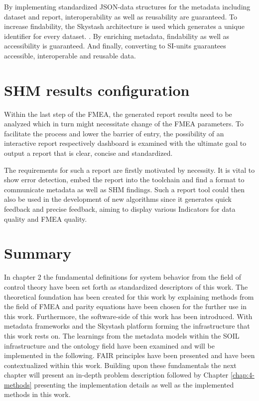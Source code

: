 
By implementing standardized JSON-data structures for the metadata including dataset and report, interoperability as well as reusability are guaranteed. To increase findability, the Skystash architecture is used which generates a unique identifier for every dataset. \cite{meyer_development_2020}. By enriching metadata, findability as well as accessibility is guaranteed. And finally, converting to SI-units guarantees accessible, interoperable and reusable data.

\newpage


\section{SHM results configuration}

Within the last step of the FMEA, the generated report results need to be analyzed which in turn might necessitate change of the FMEA parameters. To facilitate the process and lower the barrier of entry, the possibility of an interactive report respectively dashboard is examined with the ultimate goal to output a report that is clear, concise and standardized.


The requirements for such a report are firstly motivated by necessity. It is vital to show error detection, embed the report into the toolchain and find a format to communicate metadata as well as SHM findings. Such a report tool could then also be used in the development of new algorithms since it generates quick feedback and precise feedback, aiming to display various Indicators for data quality and FMEA quality.


\section{Summary}
In chapter 2 the fundamental definitions for system behavior from the field of control theory have been set forth as standardized descriptors of this work. The theoretical foundation has been created for this work by explaining methods from the field of FMEA and parity equations have been chosen for the further use in this work. Furthermore, the software-side of this work has been introduced. With metadata frameworks and the Skystash platform forming the infrastructure that this work rests on. The learnings from the metadata models within the SOIL infrastructure and the ontology field have been examined and will be implemented in the following. FAIR principles have been presented and have been contextualized within this work. Building upon these fundamentals the next chapter will present an in-depth problem description followed by Chapter \ref{chap:4-methods} presenting the implementation details as well as the implemented methods in this work.




